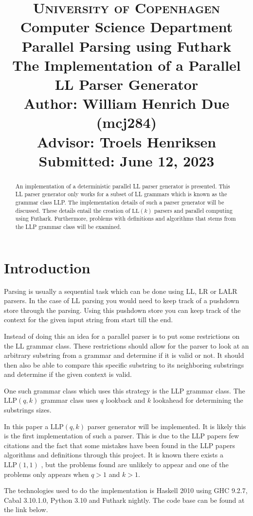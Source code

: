 \documentclass[a4paper,12pt]{article}
\title{
    {\Large \textsc{University of Copenhagen}} \\[0pt]
    {\large Computer Science Department} \\[10pt]
    {\Large Parallel Parsing using Futhark} \\[4pt]
    {\large The Implementation of a Parallel LL Parser Generator} \\[10pt]
    Author: William Henrich Due (mcj284) \\[0pt]
    Advisor: Troels Henriksen \\[0pt]
    Submitted: June 12, 2023
}
\author{}
\date{}
\newcommand\LL{\text{LL}}
\newcommand\LLP{\text{LLP}}
\theoremstyle{definition}
\begin{document}
\maketitle
\thispagestyle{firstpage}
\begin{abstract}
\noindent An implementation of a deterministic parallel LL parser generator is presented. This LL parser generator only works for a subset of LL grammars which is known as the grammar class LLP. The implementation details of such a parser generator will be discussed. These details entail the creation of $\LL(k)$ parsers and parallel computing using Futhark. Furthermore, problems with definitions and algorithms that stems from the LLP grammar class will be examined.
\end{abstract}

\tableofcontents

\section{Introduction}
Parsing is usually a sequential task which can be done using LL, LR or LALR parsers. In the case of LL parsing you would need to keep track of a pushdown store through the parsing. Using this pushdown store you can keep track of the context for the given input string from start till the end.

Instead of doing this an idea for a parallel parser is to put some restrictions on the LL grammar class. These restrictions should allow for the parser to look at an arbitrary substring from a grammar and determine if it is valid or not. It should then also be able to compare this specific substring to its neighboring substrings and determine if the given context is valid.

One such grammar class which uses this strategy is the LLP grammar class. The $\LLP(q, k)$ grammar class uses $q$ lookback and $k$ lookahead for determining the substrings sizes.

In this paper a $\LLP(q, k)$ parser generator will be implemented. It is likely this is the first implementation of such a parser. This is due to the LLP papers \cite{Vagner2007} few citations and the fact that some mistakes have been found in the LLP papers algorithms and definitions through this project. It is known there exists a $\LLP(1, 1)$ \cite{voetter2021}, but the problems found are unlikely to appear and one of the problems only appears when $q > 1$ and $k > 1$.

The technologies used to do the implementation is Haskell 2010 using GHC 9.2.7, Cabal 3.10.1.0, Python 3.10 and Futhark nightly. The code base can be found at the link below. \newline
\end{document}
